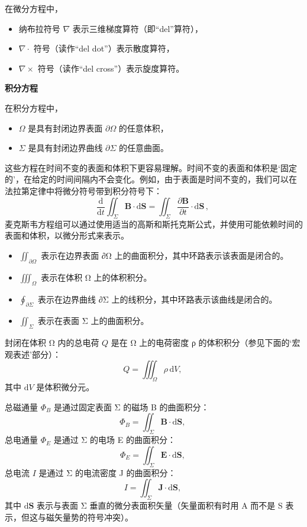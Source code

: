 在微分方程中，
\begin{itemize}
\item 纳布拉符号 \( \nabla \) 表示三维梯度算符（即“del”算符），
\item \( \nabla \cdot \) 符号（读作“del dot”）表示散度算符，
\item \( \nabla \times \) 符号（读作“del cross”）表示旋度算符。
\end{itemize}

\textbf{积分方程}

在积分方程中，
\begin{itemize}
\item \( \Omega \) 是具有封闭边界表面 \( \partial \Omega \) 的任意体积，
\item \( \Sigma \) 是具有封闭边界曲线 \( \partial \Sigma \) 的任意曲面。
\end{itemize}
这些方程在时间不变的表面和体积下更容易理解。时间不变的表面和体积是‘固定的’，在给定的时间间隔内不会变化。例如，由于表面是时间不变的，我们可以在法拉第定律中将微分符号带到积分符号下：
\[
\frac{\mathrm{d}}{\mathrm{d} t} \iint_{\Sigma} \mathbf{B} \cdot \mathrm{d} \mathbf{S} = \iint_{\Sigma} \frac{\partial \mathbf{B}}{\partial t} \cdot \mathrm{d} \mathbf{S} \,,~
\]
麦克斯韦方程组可以通过使用适当的高斯和斯托克斯公式，并使用可能依赖时间的表面和体积，以微分形式来表示。
\begin{itemize}
\item  \(\iint_{\partial \Omega}\) 表示在边界表面 ∂Ω 上的曲面积分，其中环路表示该表面是闭合的。
\item  \(\iiint_{\Omega}\) 表示在体积 Ω 上的体积积分。
\item  \(\oint_{\partial \Sigma}\) 表示在边界曲线 ∂Σ 上的线积分，其中环路表示该曲线是闭合的。
\item  \(\iint_{\Sigma}\) 表示在表面 Σ 上的曲面积分。
\end{itemize}

封闭在体积 Ω 内的总电荷 \( Q \) 是在 Ω 上的电荷密度 ρ 的体积积分（参见下面的‘宏观表述’部分）：
\[
Q = \iiint_{\Omega} \rho \, \mathrm{d} V,~
\]
其中 \( \mathrm{d} V \) 是体积微分元。

总磁通量 \( \Phi_B \) 是通过固定表面 Σ 的磁场 B 的曲面积分：
\[
\Phi_B = \iint_{\Sigma} \mathbf{B} \cdot \mathrm{d} \mathbf{S},~
\]
总电通量 \( \Phi_E \) 是通过 Σ 的电场 E 的曲面积分：
\[
\Phi_E = \iint_{\Sigma} \mathbf{E} \cdot \mathrm{d} \mathbf{S},~
\]
总电流 \( I \) 是通过 Σ 的电流密度 J 的曲面积分：
\[
I = \iint_{\Sigma} \mathbf{J} \cdot \mathrm{d} \mathbf{S},~
\]
其中 \( \mathrm{d} \mathbf{S} \) 表示与表面 Σ 垂直的微分表面积矢量（矢量面积有时用 A 而不是 S 表示，但这与磁矢量势的符号冲突）。
